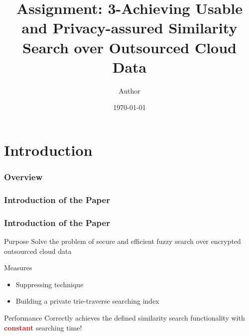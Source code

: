 \documentclass{beamer}
\title[Assignment]{Assignment: 3-Achieving Usable and Privacy-assured Similarity Search over Outsourced Cloud Data} %
\author{Author} %
\institute[DLUT] %
{
Dalian University of Technology \\
\textit{Assignment of System Security} %
\medskip %
}
\date{\today} %
\begin{document}
\section{Introduction}
\begin{frame}
\titlepage %
\end{frame}

\begin{frame}
	\frametitle{Overview} %
	\tableofcontents %
\end{frame}
\begin{frame}
	\frametitle{Introduction of the Paper}
	    
\end{frame}

\begin{frame}
 \frametitle{Introduction of the Paper}
 \begin{block}{Purpose}
  Solve the problem of secure and efficient fuzzy search over encrypted outsourced cloud data
  \end{block}
  
  \begin{block}{Measures}
  	\begin{itemize}
  		\item Suppressing technique 
  		\item Building a private trie-traverse searching index
  	\end{itemize}
  \end{block}
  
  \begin{block}{Performance}
	  Correctly achieves the defined similarity search functionality with \textbf{\textcolor{red}{constant}}  searching time!
  \end{block}
  
  
\end{frame}


\end{document}
